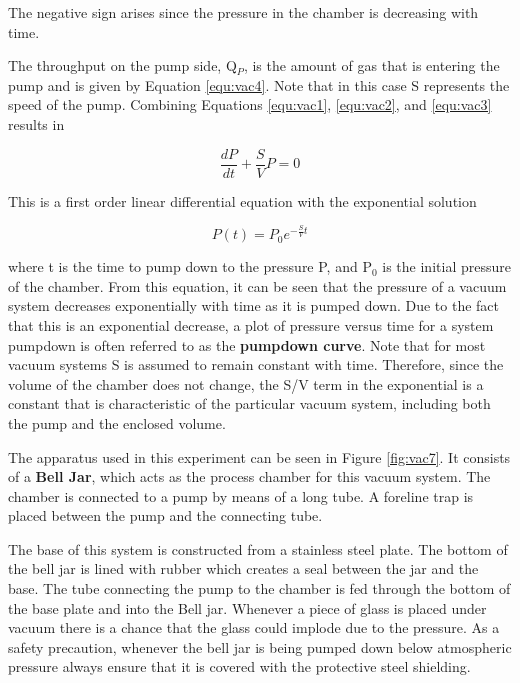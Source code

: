 \noindent The negative sign arises since the pressure in the chamber is decreasing with time.

The throughput on the pump side, Q$_P$, is the amount of gas that is entering the pump and is given by Equation \ref{equ:vac4}. Note that in this case S represents the speed of the pump. Combining Equations \ref{equ:vac1}, \ref{equ:vac2}, and \ref{equ:vac3} results in

\begin{equation}
\dfrac{dP}{dt}+\dfrac{S}{V}P=0
\label{equ:vac4}
\end{equation}

\noindent This is a first order linear differential equation with the exponential solution

\begin{equation}
P(t)=P_0e^{-\frac{S}{V}t}
\label{equ:vac5}
\end{equation}

\noindent where t is the time to pump down to the pressure P, and P$_0$ is the initial pressure of the chamber. From this equation, it can be seen that the pressure of a vacuum system decreases exponentially with time as it is pumped down. Due to the fact that this is an exponential decrease, a plot of pressure versus time for a system pumpdown is often referred to as the {\bf pumpdown curve}. Note that for most vacuum systems S is assumed to remain constant with time. Therefore, since the volume of the chamber does not change, the S/V term in the exponential is a constant that is characteristic of the particular vacuum system, including both the pump and the enclosed volume.

The apparatus used in this experiment can be seen in Figure \ref{fig:vac7}. It consists of a {\bf Bell Jar}, which acts as the process chamber for this vacuum system. The chamber is connected to a pump by means of a long tube. A foreline trap is placed between the pump and the connecting tube.

The base of this system is constructed from a stainless steel plate. The bottom of the bell jar is lined with rubber which creates a seal between the jar and the base. The tube connecting the pump to the chamber is fed through the bottom of the base plate and into the Bell jar. Whenever a piece of glass is placed under vacuum there is a chance that the glass could implode due to the pressure. As a safety precaution, whenever the bell jar is being pumped down below atmospheric pressure always ensure that it is covered with the protective steel shielding.

